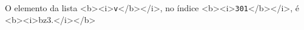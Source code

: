 \documentclass[12pt,varwidth=1<b><i>19072</b></i>cm,border=1pt]{standalone}
\begin{document}
 
 
O elemento da lista <b><i>\verb+v+</b></i>, no índice <b><i>\verb+301+</b></i>, é <b><i>bz3.</i></b> 
 
\questiomfalse 
 
\end{document}
